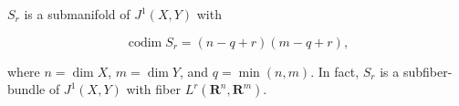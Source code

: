 $S_r$ is a submanifold of $J^1(X, Y)$ with

$$\operatorname{codim} S_r = (n - q + r)(m - q + r),$$

where $n = \dim X$, $m = \dim Y$, and $q = \min(n, m)$. In fact, $S_r$ is a subfiber-bundle of $J^1(X, Y)$ with fiber $L^r(\mathbf{R}^n, \mathbf{R}^m)$.

